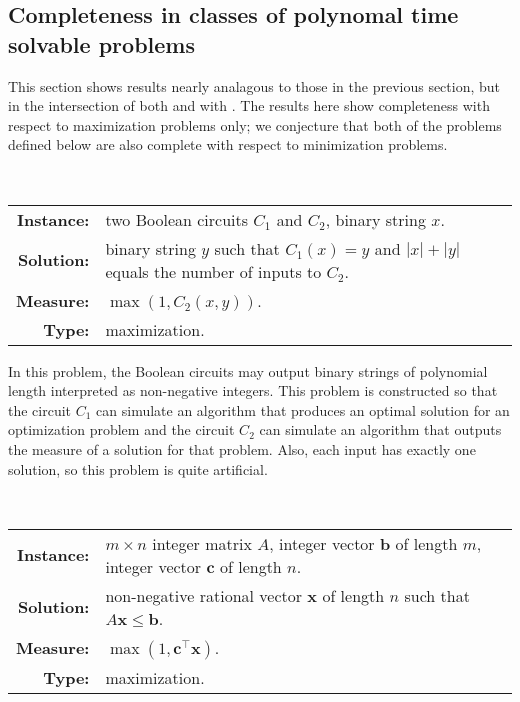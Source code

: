 \documentclass[]{article}
\begin{document}
\subsection{Completeness in classes of polynomal time solvable problems}

This section shows results nearly analagous to those in the previous section, but in the intersection of both \NPO{} and \NNCO{} with \PO.
The results here show completeness with respect to maximization problems only; we conjecture that both of the problems defined below are also complete with respect to minimization problems.

\begin{definition}
  \mbox{} \\
  \begin{tabular}{r p{9.5cm}}
    \textbf{Instance:} & two Boolean circuits $C_1$ and $C_2$, binary string $x$. \\
    \textbf{Solution:} & binary string $y$ such that $C_1(x) = y$ and $|x| + |y|$ equals the number of inputs to $C_2$. \\
    \textbf{Measure:} & $\max(1, C_2(x, y))$. \\
    \textbf{Type:} & maximization.
  \end{tabular}
\end{definition}

In this problem, the Boolean circuits may output binary strings of polynomial length interpreted as non-negative integers.
This problem is constructed so that the circuit $C_1$ can simulate an algorithm that produces an optimal solution for an optimization problem and the circuit $C_2$ can simulate an algorithm that outputs the measure of a solution for that problem.
Also, each input has exactly one solution, so this problem is quite artificial.

\begin{definition}
  \mbox{} \\
  \begin{tabular}{r p{9.5cm}}
    \textbf{Instance:} & $m \times n$ integer matrix $A$, integer vector $\mathbf{b}$ of length $m$, integer vector $\mathbf{c}$ of length $n$. \\
    \textbf{Solution:} & non-negative rational vector $\mathbf{x}$ of length $n$ such that $A \mathbf{x} \leq \mathbf{b}$. \\
    \textbf{Measure:} & $\max(1, \mathbf{c}^\intercal \mathbf{x})$. \\
    \textbf{Type:} & maximization.
  \end{tabular}
\end{definition}
\end{document}
